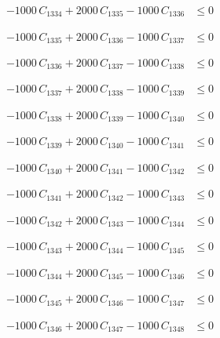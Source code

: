 \documentclass[a4paper,11pt]{article}
\begin{document}
\begin{align}
-1000\,C_{1334} + 2000\,C_{1335} - 1000\,C_{1336} &\leq 0 \nonumber
\end{align}

\begin{align}
-1000\,C_{1335} + 2000\,C_{1336} - 1000\,C_{1337} &\leq 0 \nonumber
\end{align}

\begin{align}
-1000\,C_{1336} + 2000\,C_{1337} - 1000\,C_{1338} &\leq 0 \nonumber
\end{align}

\begin{align}
-1000\,C_{1337} + 2000\,C_{1338} - 1000\,C_{1339} &\leq 0 \nonumber
\end{align}

\begin{align}
-1000\,C_{1338} + 2000\,C_{1339} - 1000\,C_{1340} &\leq 0 \nonumber
\end{align}

\begin{align}
-1000\,C_{1339} + 2000\,C_{1340} - 1000\,C_{1341} &\leq 0 \nonumber
\end{align}

\begin{align}
-1000\,C_{1340} + 2000\,C_{1341} - 1000\,C_{1342} &\leq 0 \nonumber
\end{align}

\begin{align}
-1000\,C_{1341} + 2000\,C_{1342} - 1000\,C_{1343} &\leq 0 \nonumber
\end{align}

\begin{align}
-1000\,C_{1342} + 2000\,C_{1343} - 1000\,C_{1344} &\leq 0 \nonumber
\end{align}

\begin{align}
-1000\,C_{1343} + 2000\,C_{1344} - 1000\,C_{1345} &\leq 0 \nonumber
\end{align}

\begin{align}
-1000\,C_{1344} + 2000\,C_{1345} - 1000\,C_{1346} &\leq 0 \nonumber
\end{align}

\begin{align}
-1000\,C_{1345} + 2000\,C_{1346} - 1000\,C_{1347} &\leq 0 \nonumber
\end{align}

\begin{align}
-1000\,C_{1346} + 2000\,C_{1347} - 1000\,C_{1348} &\leq 0 \nonumber
\end{align}
\end{document}
